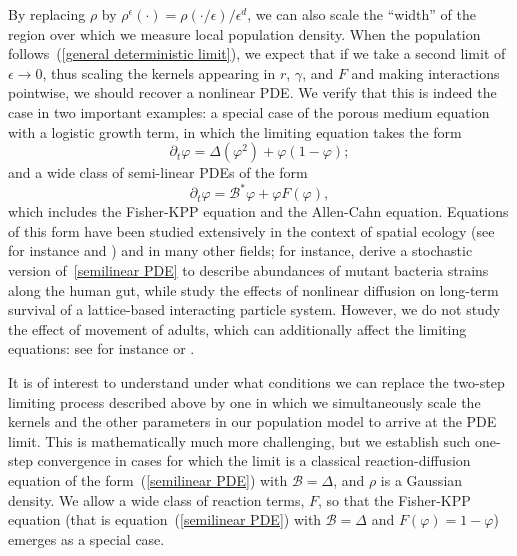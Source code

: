 \documentclass[EJP]{ejpecp} %
\newcommand{\DG}{\mathcal{B}}  %
\newcommand{\citet}[1]{\cite{#1}}
\begin{document}
By replacing $\rho$ by
$\rho^\epsilon(\cdot)=\rho(\cdot/\epsilon)/\epsilon^d$, 
we can also scale the ``width'' of the 
region over which we measure local population density. 
When the population follows~(\ref{general deterministic limit}), 
we expect that if we take a second limit of $\epsilon \to 0$,
thus scaling the kernels appearing in $r$, $\gamma$, and $F$ and making interactions pointwise,
we should recover a nonlinear PDE.
We verify that this is indeed the case in two important examples:
a special case of the porous medium equation with a logistic growth term, in which
the limiting equation takes the form 
\begin{equation}
	\label{PME1}
	\partial_t \varphi = \Delta (\varphi^2)+\varphi(1-\varphi);
\end{equation}
and a wide class of semi-linear PDEs of the form 
\begin{equation}
\label{semilinear PDE}
\partial_t \varphi = \DG^*\varphi+ \varphi F(\varphi),
\end{equation}
which includes the Fisher-KPP equation and the Allen-Cahn equation.
Equations of this form have been studied extensively
in the context of spatial ecology
(see for instance \citet{lam2023introduction} and \citet{cantrell2004spatial})
and in many other fields;
for instance, \citet{ghosh2022emergent}
derive a stochastic version of~\eqref{semilinear PDE} to describe abundances of mutant bacteria strains
along the human gut,
while \citet{li/buenzli/simpson:2022} study the effects of nonlinear diffusion
on long-term survival of a lattice-based interacting particle system.
However, we do not study the effect of movement of adults,
which can additionally affect the limiting equations:
see for instance \citet{holmes/lewis/banks/veit:1994} or \citet{potts/borger:2023}.

It is of interest to understand under what conditions we can replace the two-step limiting
process described above by one in which we simultaneously scale the 
kernels
and the other parameters in 
our population model to arrive at the PDE limit.
This is mathematically much more challenging, but we establish such 
one-step convergence in cases for which the limit is a classical 
reaction-diffusion equation of the form~(\ref{semilinear PDE}) with 
$\DG=\Delta$,
and $\rho$ is a Gaussian density. We allow a wide class of reaction terms, $F$, so
that the Fisher-KPP equation 
(that is equation~(\ref{semilinear PDE}) with $\DG=\Delta$ and $F(\varphi)=1-\varphi$)
emerges as a special case.
\end{document}

